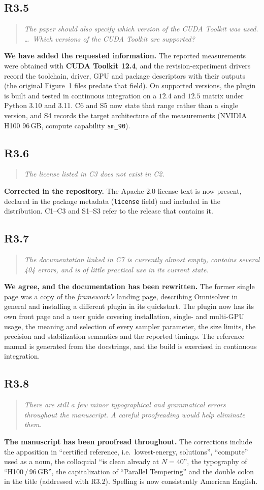 \documentclass[11pt,a4paper]{article}
\newenvironment{reviewercomment}
  {\begin{quote}\itshape\small}
  {\end{quote}}
\newcommand{\point}[2]{%
  \subsection*{#1}%
  \begin{reviewercomment}#2\end{reviewercomment}}
\begin{document}
\point{R3.5}{The paper should also specify which version of the CUDA Toolkit was used. \dots\
Which versions of the CUDA Toolkit are supported?}

\textbf{We have added the requested information.} The reported measurements were obtained with
\textbf{CUDA Toolkit 12.4}, and the revision-experiment drivers record the toolchain, driver,
GPU and package descriptors with their outputs (the original Figure~1 files predate that
field). On supported versions, the plugin is built and tested in continuous integration on a
$12.4$ and $12.5$ matrix under Python 3.10 and 3.11. C6 and S5 now state that range rather than
a single version, and S4 records the target architecture of the measurements (NVIDIA H100
96\,GB, compute capability \texttt{sm\_90}).

\point{R3.6}{The license listed in C3 does not exist in C2.}

\textbf{Corrected in the repository.} The Apache-2.0 license text is now present, declared in
the package metadata (\texttt{license} field) and included in the distribution. C1--C3 and
S1--S3 refer to the release that contains it.

\point{R3.7}{The documentation linked in C7 is currently almost empty, contains several 404
errors, and is of little practical use in its current state.}

\textbf{We agree, and the documentation has been rewritten.} The former single page was a copy
of the \emph{framework's} landing page, describing Omnisolver in general and installing a
different plugin in its quickstart. The plugin now has its own front page and a user guide
covering installation, single- and multi-GPU usage, the meaning and selection of every sampler
parameter, the size limits, the precision and stabilization semantics and the reported timings.
The reference manual is generated from the docstrings, and the build is exercised in continuous
integration.

\point{R3.8}{There are still a few minor typographical and grammatical errors throughout the
manuscript. A careful proofreading would help eliminate them.}

\textbf{The manuscript has been proofread throughout.} The corrections include the apposition
in ``certified reference, i.e.\ lowest-energy, solutions'', ``compute'' used as a noun, the
colloquial ``is clean already at $N=40$'', the typography of ``H100\,/\,96\,GB'', the
capitalization of ``Parallel Tempering'' and the double colon in the title (addressed with
R3.2). Spelling is now consistently American English.
\end{document}
